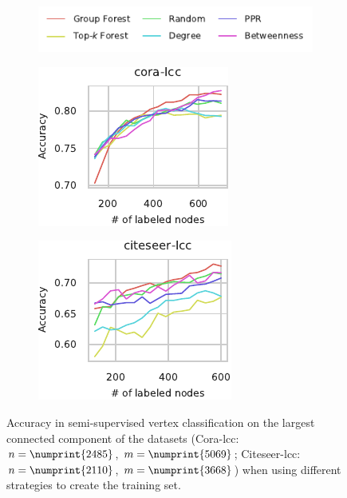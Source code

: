 \begin{figure}[tb]
\centering
\begin{subfigure}[t]{\textwidth}
\centering
\includegraphics{sources/plots/el-clos/legend-node-class.pdf}
\end{subfigure}\smallskip

\begin{subfigure}[t]{.45\textwidth}
\centering
\includegraphics[width=.7\textwidth]{sources/plots/el-clos/node-class-cora_lcc.pdf}
\end{subfigure}\hfill
\begin{subfigure}[t]{.45\textwidth}
\centering
\includegraphics[width=.7\textwidth]{sources/plots/el-clos/node-class-citeseer_lcc.pdf}
\end{subfigure}
\caption{Accuracy in semi-supervised vertex classification on the largest
connected component of the datasets (Cora-lcc: $n = \numprint{2485}$,
$m = \numprint{5069}$; Citeseer-lcc: $n = \numprint{2110}$, $m = \numprint{3668}$)
when using different strategies to create the training set.}
\label{fig:el-clos:vertex-class-lcc}
\end{figure}

